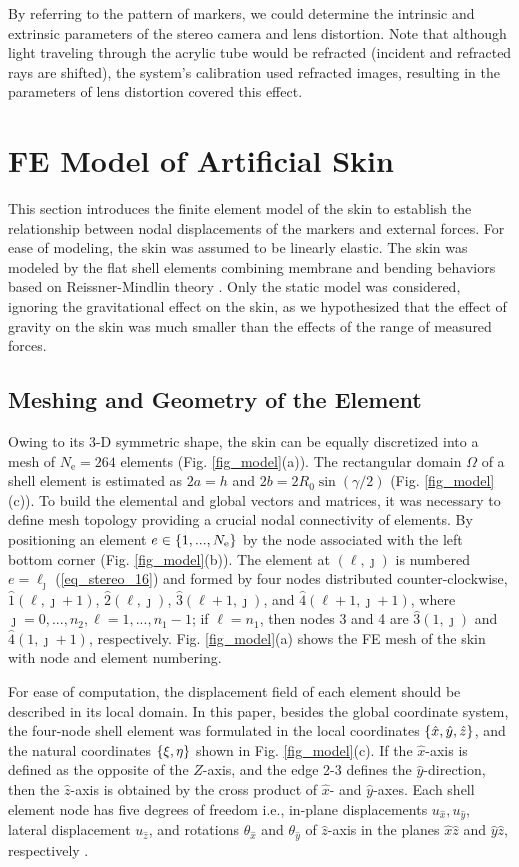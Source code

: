 \documentclass[10pt,letterpaper,journal,final,twoside,twocolumn,nofonttune]{IEEEtran}
\begin{document}
By referring to the pattern of markers, we could determine the intrinsic and extrinsic parameters of the stereo camera and lens distortion. Note that although light traveling through the acrylic tube would be refracted (incident and refracted rays are shifted), the system’s calibration used refracted images, resulting in the parameters of lens distortion covered this effect.
\section{FE Model of Artificial Skin}
This section introduces the finite element model of the skin to establish the relationship between nodal displacements of the markers and external forces. For ease of modeling, the skin was assumed to be linearly elastic. The skin was modeled by the flat shell elements combining membrane and bending behaviors based on Reissner-Mindlin theory \cite{Onate}. Only the static model was considered, ignoring the gravitational effect on the skin, as we hypothesized that the effect of gravity on the skin was much smaller than the effects of the range of measured forces.
\subsection{Meshing and Geometry of the Element}
Owing to its 3-D symmetric shape, the skin can be equally discretized into a mesh of $N_{\text{e}}=264$ elements (Fig. \ref{fig_model}(a)). The rectangular domain $\Omega$ of a shell element is estimated as $2a = h$ and $2b = 2R_0\sin\left (\gamma/2\right )$ (Fig. \ref{fig_model}(c)). To build the elemental and global vectors and matrices, it was necessary to define mesh topology providing a crucial nodal connectivity of elements. By positioning an element $e \in \set{1,...,N_{\text{e}}}$ by the node associated with the left bottom corner (Fig. \ref{fig_model}(b)). The element at $(\ell,\jmath)$ is numbered $e=\ell_\jmath$ (\ref{eq_stereo_16}) and formed by four nodes distributed counter-clockwise, $\hat{1}(\ell,\jmath+1)$, $\hat{2}(\ell,\jmath)$, $\hat{3}(\ell+1,\jmath)$, and $\hat{4}(\ell+1,\jmath+1)$,  where $\jmath = 0,...,n_2, \ell = 1,...,n_1-1$; if $\ell=n_1$, then nodes 3 and 4 are $\hat{3}(1,\jmath)$ and $\hat{4}(1,\jmath+1)$, respectively. Fig. \ref{fig_model}(a) shows the FE mesh of the skin with node and element numbering.

For ease of computation, the displacement field of each element should be described in its local domain. In this paper, besides the global coordinate system, the four-node shell element was formulated in the local coordinates $\set{\hat{x},\hat{y},\hat{z}}$, and the natural coordinates $\set{\xi,\eta}$ shown in Fig. \ref{fig_model}(c). If the $\hat{x}$-axis is defined as the opposite of the $Z$-axis, and the edge 2-3 defines the $\hat{y}$-direction, then the $\hat{z}$-axis is obtained by the cross product of $\hat{x}$- and $\hat{y}$-axes. Each  shell element node has five degrees of freedom i.e., in-plane displacements $u_{\hat{x}},u_{\hat{y}}$, lateral displacement $u_{\hat{z}}$, and rotations $\theta_{\hat{x}}$ and $\theta_{\hat{y}}$ of $\hat{z}$-axis in the planes $\hat{x}\hat{z}$ and $\hat{y}\hat{z}$, respectively \cite{Onate}. 
\end{document}
